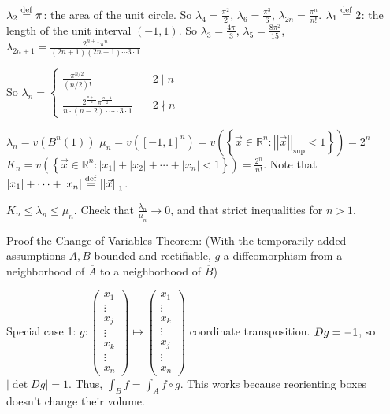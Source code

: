\documentclass[10pt,letterpaper]{article}
\newcommand{\n}{\hfill\break}
\newcommand{\ptxt}[1]{\textrm{\textnormal{#1}}}
\newcommand{\set}[1]{\left\{#1\right\}}
\newcommand{\reals}{\mathbb{R}}
\newcommand{\R}{\reals}
\let\deg\relax
\DeclareMathOperator{\deg}{deg}
\newcommand{\abs}[1]{\left|#1\right|}
\newcommand{\of}{\circ}
\newcommand{\ndiv}{\nmid}
\newcommand{\divides}{\mid}
\newcommand{\norm}[1]{\abs{\abs{#1}}}
\newcommand{\closure}[1]{\overline{#1}}
\newcommand{\paren}[1]{\left(#1\right)}
\begin{document}
\par\noindent $\lambda_{2}\overset{\ptxt{def}}{=}\pi$: the area of the unit circle. So $\lambda_{4}=\frac{\pi^{2}}{2}$, $\lambda_{6}=\frac{\pi^{3}}{6}$, $\lambda_{2n}=\frac{\pi^{n}}{n!}$.\n
$\lambda_{1}\overset{\ptxt{def}}{=}2$: the length of the unit interval $(-1,1)$. So $\lambda_{3}=\frac{4\pi}{3}$, $\lambda_{5}=\frac{8\pi^{2}}{15}$, $\lambda_{2n+1}=\frac{2^{n+1}\pi^{n}}{(2n+1)(2n-1)\cdots{}3\cdot{}1}$

\par\noindent So $\displaystyle\lambda_{n}=\left\{\begin{array}{ll}\frac{\pi^{n/2}}{(n/2)!} & \quad{}2\divides{}n\\ \frac{2^{\frac{n+1}{2}}\pi^{\frac{n-1}{2}}}{n\cdot(n-2)\cdot\cdots\cdot{}3\cdot{}1} & \quad{}2\ndiv{}n\end{array}\right.$\n

\par\noindent $\lambda_{n}=v(B^{n}(1))$\n
$\mu_{n}=v([-1,1]^{n})=v\paren{\set{\vec{x}\in\R^{n}:\norm{\vec{x}}_{\sup}<1}}=2^{n}$\n
$K_{n}=v\paren{\set{\vec{x}\in\R^{n}:\abs{x_{1}}+\abs{x_{2}}+\cdots+\abs{x_{n}}<1}}=\frac{2^{n}}{n!}$. Note that $\abs{x_{1}}+\cdots+\abs{x_{n}}\overset{\ptxt{def}}{=}\norm{\vec{x}}_{1}$.\n

\par\noindent $K_{n}\le\lambda_{n}\le\mu_{n}$. Check that $\frac{\lambda_{n}}{\mu_{n}}\to{}0$, and that strict inequalities for $n>1$.\n

\par\noindent Proof the Change of Variables Theorem:\n
(With the temporarily added assumptions $A,B$ bounded and rectifiable, $g$ a diffeomorphism from a neighborhood of $\closure{A}$ to a neighborhood of $\closure{B}$)\n

\par\noindent Special case 1: $g:\paren{\begin{array}{c}x_{1}\\ \vdots\\ x_{j}\\ \vdots\\ x_{k}\\ \vdots\\ x_{n}\end{array}}\mapsto\paren{\begin{array}{c}x_{1}\\ \vdots\\ x_{k}\\ \vdots\\ x_{j}\\ \vdots\\ x_{n}\end{array}}$ coordinate transposition. $\deg{}Dg=-1$, so $\abs{\det{}Dg}=1$.\n
Thus, $\displaystyle\int_{B}f=\int_{A}f\of{}g$. This works because reorienting boxes doesn't change their volume.\n
\end{document}
